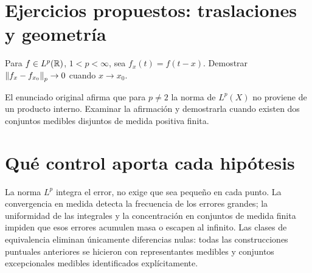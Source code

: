 \section{Ejercicios propuestos: traslaciones y geometría}
\begin{ejercicio}\label{ej:v2-l19-1}
Para $f\in L^p(\mathbb R)$, $1<p<\infty$, sea $f_x(t)=f(t-x)$. Demostrar $\left\lVert f_x-f_{x_0}\right\rVert_p\to0$ cuando $x\to x_0$.
\end{ejercicio}

\begin{ejercicio}\label{ej:v2-l19-2}
El enunciado original afirma que para $p\ne2$ la norma de $L^p(X)$ no proviene de un producto interno. Examinar la afirmación y demostrarla cuando existen dos conjuntos medibles disjuntos de medida positiva finita.
\end{ejercicio}

\section{Qué control aporta cada hipótesis}
La norma $L^p$ integra el error, no exige que sea pequeño en cada punto. La convergencia en medida detecta la frecuencia de los errores grandes; la uniformidad de las integrales y la concentración en conjuntos de medida finita impiden que esos errores acumulen masa o escapen al infinito. Las clases de equivalencia eliminan únicamente diferencias nulas: todas las construcciones puntuales anteriores se hicieron con representantes medibles y conjuntos excepcionales medibles identificados explícitamente.
